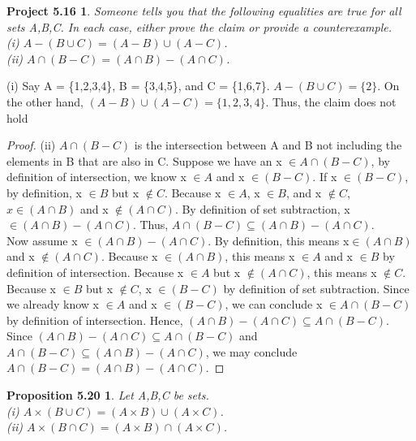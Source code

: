 \documentclass[12pt]{amsart}
\begin{document}
\newtheorem*{proj5.16}{Project 5.16}
\begin{proj5.16}
	Someone tells you that the following equalities are true for all sets A,B,C. In each case, either prove the claim or provide a counterexample.
	\\(i) $A - (B \cup C) = (A - B) \cup (A - C)$.
	\\(ii) $A \cap (B - C) = (A \cap B) - (A \cap C)$.
\end{proj5.16}
	(i) Say A = \{1,2,3,4\}, B = \{3,4,5\}, and C = \{1,6,7\}. $A - (B \cup C) = \{2\}$. On the other hand, $(A - B) \cup (A - C) = \{1,2,3,4\}$. Thus, the claim does not hold
	\begin{proof}
	(ii) $A \cap (B-C)$ is the intersection between A and B not including the elements in B that are also in C. Suppose we have an x $\in A \cap (B-C)$, by definition of intersection, we know x $\in A$ and x $\in (B - C)$. If x $\in (B - C)$, by definition, x $\in B$ but x  $\notin C$. Because x $\in A$, x $\in B$, and x $\notin C$, $x \in (A \cap B)$ and x $\notin (A \cap C)$. By definition of set subtraction, x $\in (A \cap B) - (A \cap C)$. Thus, $A \cap (B - C) \subseteq (A \cap B) - (A \cap C)$.
	\\\indent Now assume x $\in (A \cap B) - (A \cap C)$. By definition, this means x$\in (A \cap B)$ and x $\notin (A \cap C)$. Because x $\in (A \cap B)$, this means x $\in A$ and x $\in B$ by definition of intersection. Because x $\in A$ but x $\notin (A \cap C)$, this means x $\notin C$. Because x $\in B$ but x $\notin C$, x $\in (B - C)$ by definition of set subtraction. Since we already know x $\in A$ and x $\in (B - C)$, we can conclude x $\in A \cap (B - C)$ by definition of intersection. Hence, $(A \cap B) - (A \cap C) \subseteq A \cap (B - C)$. Since $(A \cap B) - (A \cap C) \subseteq A \cap (B - C)$ and $A \cap (B - C) \subseteq (A \cap B) - (A \cap C)$, we may conclude $A \cap (B - C) = (A \cap B) - (A \cap C)$.
	\end{proof}

\newtheorem*{prop5.20}{Proposition 5.20}
\begin{prop5.20}
	Let A,B,C be sets.
	\\(i) $A \times (B \cup C) = (A \times B) \cup (A \times C)$.
	\\(ii) $A \times (B \cap C) = (A \times B) \cap (A \times C)$.
\end{prop5.20}
\end{document}
